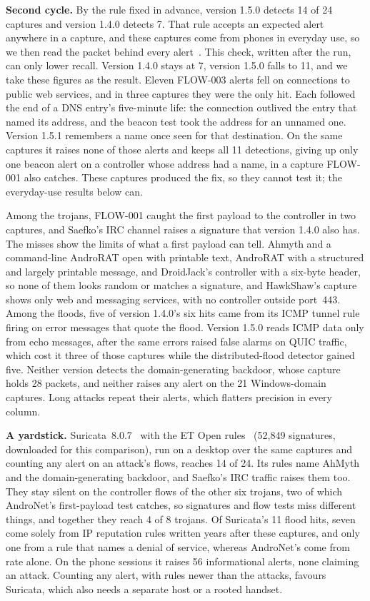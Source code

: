 \documentclass[runningheads]{llncs}
\begin{document}
\textbf{Second cycle.} By the rule fixed in advance, version 1.5.0 detects 14 of 24 captures and version 1.4.0 detects 7. That rule accepts an expected alert anywhere in a capture, and these captures come from phones in everyday use, so we then read the packet behind every alert~\cite{repo}. This check, written after the run, can only lower recall. Version 1.4.0 stays at 7, version 1.5.0 falls to 11, and we take these figures as the result. Eleven FLOW-003 alerts fell on connections to public web services, and in three captures they were the only hit. Each followed the end of a DNS entry's five-minute life: the connection outlived the entry that named its address, and the beacon test took the address for an unnamed one. Version 1.5.1 remembers a name once seen for that destination. On the same captures it raises none of those alerts and keeps all 11 detections, giving up only one beacon alert on a controller whose address had a name, in a capture FLOW-001 also catches. These captures produced the fix, so they cannot test it; the everyday-use results below can.

Among the trojans, FLOW-001 caught the first payload to the controller in two captures, and Saefko's IRC channel raises a signature that version 1.4.0 also has. The misses show the limits of what a first payload can tell. Ahmyth and a command-line AndroRAT open with printable text, AndroRAT with a structured and largely printable message, and DroidJack's controller with a six-byte header, so none of them looks random or matches a signature, and HawkShaw's capture shows only web and messaging services, with no controller outside port~443. Among the floods, five of version 1.4.0's six hits came from its ICMP tunnel rule firing on error messages that quote the flood. Version 1.5.0 reads ICMP data only from echo messages, after the same errors raised false alarms on QUIC traffic, which cost it three of those captures while the distributed-flood detector gained five. Neither version detects the domain-generating backdoor, whose capture holds 28 packets, and neither raises any alert on the 21 Windows-domain captures. Long attacks repeat their alerts, which flatters precision in every column.

\textbf{A yardstick.} Suricata~8.0.7~\cite{suricata} with the ET Open rules~\cite{etopen} (52{,}849 signatures, downloaded for this comparison), run on a desktop over the same captures and counting any alert on an attack's flows, reaches 14 of 24. Its rules name AhMyth and the domain-generating backdoor, and Saefko's IRC traffic raises them too. They stay silent on the controller flows of the other six trojans, two of which AndroNet's first-payload test catches, so signatures and flow tests miss different things, and together they reach 4 of 8 trojans. Of Suricata's 11 flood hits, seven come solely from IP reputation rules written years after these captures, and only one from a rule that names a denial of service, whereas AndroNet's come from rate alone. On the phone sessions it raises 56 informational alerts, none claiming an attack. Counting any alert, with rules newer than the attacks, favours Suricata, which also needs a separate host or a rooted handset.
\end{document}
